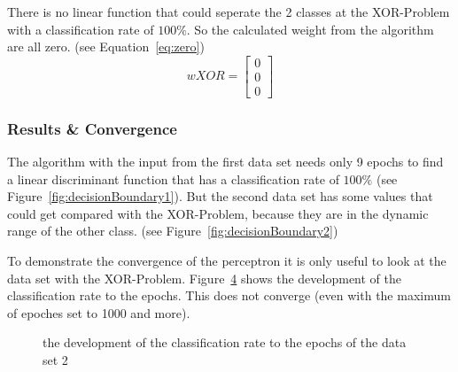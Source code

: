 \documentclass[subfigure,epsfig,fleqn,float,ausarbeitung]{scrartcl}
\begin{document}
There is no linear function that could seperate the 2 classes at the XOR-Problem with a classification rate of $100\%$. So the calculated weight from the algorithm are all zero. (see Equation~\ref{eq:zero})
\begin{equation}
wXOR = 
	\begin{bmatrix}
    0\\0\\0
	\end{bmatrix}
	\label{eq:zero}
\end{equation}
\begin{figure}
	\centering
	\setlength\figureheight{6cm} 
	\setlength\figurewidth{8cm}
	
	\caption{}
	\label{fig:and}
\end{figure}
\begin{figure}
	\centering
	\setlength\figureheight{6cm} 
	\setlength\figurewidth{8cm}
	
	\caption{}
	\label{fig:or}
\end{figure}
\begin{figure}
	\centering
	\setlength\figureheight{6cm} 
	\setlength\figurewidth{8cm}
	
	\caption{}
	\label{fig:xor}
\end{figure}


\subsubsection{Results \& Convergence}

The algorithm with the input from the first data set needs only 9 epochs to find a linear discriminant function that has a classification rate of $100\%$ (see Figure~\ref{fig:decisionBoundary1}). But the second data set has some values that could get compared with the XOR-Problem, because they are in the dynamic range of the other class. (see Figure~\ref{fig:decisionBoundary2})


To demonstrate the convergence of the perceptron it is only useful to look at the data set with the XOR-Problem. Figure~\ref{fig:epochs} shows the development of the classification rate to the epochs. This does not converge (even with the maximum of epoches set to 1000 and more). 

\begin{figure}
	\centering
	\setlength\figureheight{6cm} 
	\setlength\figurewidth{8cm}
	
	\caption{the development of the classification rate to the epochs of the data set 2}
	\label{fig:epochs}
\end{figure}
\end{document}
